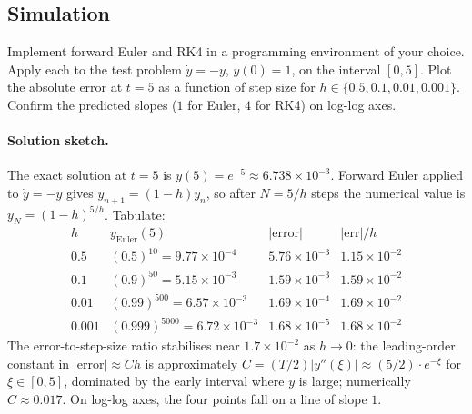 \subsection*{Simulation}

\begin{exercise}
Implement forward Euler and RK4 in a programming environment of
your choice. Apply each to the test problem $\dot{y} = -y$,
$y(0) = 1$, on the interval $[0, 5]$. Plot the absolute error at
$t = 5$ as a function of step size for $h \in \{0.5, 0.1, 0.01,
0.001\}$. Confirm the predicted slopes ($1$ for Euler, $4$ for
RK4) on log-log axes.

\paragraph{Solution sketch.} The exact solution at $t = 5$ is
$y(5) = e^{-5} \approx 6.738 \times 10^{-3}$. Forward Euler
applied to $\dot{y} = -y$ gives $y_{n+1} = (1 - h) y_{n}$, so
after $N = 5/h$ steps the numerical value is $y_{N} = (1 -
h)^{5/h}$. Tabulate:
\[
\begin{array}{c|c|c|c}
h & y_{\text{Euler}}(5) & |\text{error}| & |\text{err}|/h \\\hline
0.5   & (0.5)^{10}   = 9.77 \times 10^{-4}   & 5.76 \times 10^{-3} & 1.15 \times 10^{-2} \\
0.1   & (0.9)^{50}   = 5.15 \times 10^{-3}   & 1.59 \times 10^{-3} & 1.59 \times 10^{-2} \\
0.01  & (0.99)^{500} = 6.57 \times 10^{-3}   & 1.69 \times 10^{-4} & 1.69 \times 10^{-2} \\
0.001 & (0.999)^{5000} = 6.72 \times 10^{-3} & 1.68 \times 10^{-5} & 1.68 \times 10^{-2}
\end{array}
\]
The error-to-step-size ratio stabilises near $1.7 \times 10^{-2}$
as $h \to 0$: the leading-order constant in $|\text{error}|
\approx C h$ is approximately $C = (T/2) |y''(\xi)| \approx (5/2)
\cdot e^{-\xi}$ for $\xi \in [0, 5]$, dominated by the early
interval where $y$ is large; numerically $C \approx 0.017$. On
log-log axes, the four points fall on a line of slope $1$.


\end{exercise}
